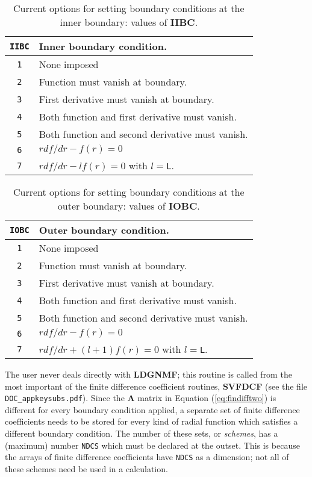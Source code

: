 \begin{table}
\begin{tabular}{|c|l|}
\hline
\verb+IIBC+ & Inner boundary condition. \\
\hline
\hline
\verb+1+ & None imposed \\
\hline
\verb+2+ & Function must vanish at boundary. \\
\hline
\verb+3+ & First derivative must vanish at boundary. \\
\hline
\verb+4+ & Both function and first derivative must vanish. \\
\hline
\verb+5+ & Both function and second derivative must vanish. \\
\hline
\verb+6+ & $rdf/dr - f(r) = 0$ \\
\hline
\verb+7+ & $r df/dr - l f(r) = 0$ with $l=$\verb+L+. \\
\hline
\end{tabular}
\caption{ 
\label{tab:iibcoptions}
Current options for setting boundary conditions at
the inner boundary: values of {\bf IIBC}.}
\end{table}

\begin{table}
\begin{tabular}{|c|l|}
\hline
\verb+IOBC+ & Outer boundary condition. \\
\hline
\hline
\verb+1+ & None imposed \\
\hline
\verb+2+ & Function must vanish at boundary. \\
\hline
\verb+3+ & First derivative must vanish at boundary. \\
\hline
\verb+4+ & Both function and first derivative must vanish. \\
\hline
\verb+5+ & Both function and second derivative must vanish. \\
\hline
\verb+6+ & $rdf/dr - f(r) = 0$ \\
\hline
\verb+7+ & $r df/dr + (l+1) f(r) = 0$ with $l=$\verb+L+. \\
\hline
\end{tabular}
\caption{ 
\label{tab:iobcoptions}
Current options for setting boundary conditions at
the outer boundary: values of {\bf IOBC}.}
\end{table}

The user never deals directly with {\bf LDGNMF};
this routine is called from the most important
of the finite difference coefficient routines,
{\bf SVFDCF} 
(see the file \verb+DOC_appkeysubs.pdf+).
Since the ${\bm A}$ matrix in Equation (\ref{eq:findifftwo})
is different for every boundary condition applied,
a separate set of finite difference coefficients
needs to be stored for every kind of radial function
which satisfies a different boundary condition.
The number of these sets, or {\it schemes}, has
a (maximum) number \verb.NDCS.
which must be declared at the outset. 
This is because the arrays of finite difference coefficients
have \verb.NDCS. as a dimension; not all of these
schemes need be used in a calculation.


